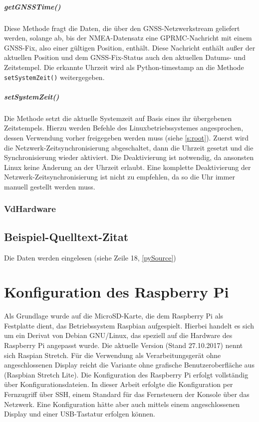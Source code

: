 \documentclass[a4paper,12pt,bibliography=totoc, listof=totoc,titlepage,pointlessnumbers]{scrreprt}
\newcommand{\code}[1]{\texttt{#1}}
\begin{document}
\paragraph{getGNSSTime()}
Diese Methode fragt die Daten, die über den GNSS-Netzwerkstream geliefert werden, solange ab, bis der NMEA-Datensatz eine GPRMC-Nachricht mit einem GNSS-Fix, also einer gültigen Position, enthält. Diese Nachricht enthält außer der aktuellen Position und dem GNSS-Fix-Status auch den aktuellen Datums- und Zeitstempel. Die erkannte Uhrzeit wird als Python-timestamp an die Methode \code{setSystemZeit()} weitergegeben.

\paragraph{setSystemZeit()}
Die Methode setzt die aktuelle Systemzeit auf Basis eines ihr übergebenen Zeitstempels. Hierzu werden Befehle des Linuxbetriebssystemes angesprochen, dessen Verwendung vorher freigegeben werden muss (siehe \autoref{s:root}). Zuerst wird die Netzwerk-Zeitsynchronisierung abgeschaltet, dann die Uhrzeit gesetzt und die Synchronisierung wieder aktiviert. Die Deaktivierung ist notwendig, da ansonsten Linux keine Änderung an der Uhrzeit erlaubt. Eine komplette Deaktivierung der Netzwerk-Zeitsynchronisierung ist nicht zu empfehlen, da so die Uhr immer manuell gestellt werden muss.

\subsection{VdHardware}



\section{Beispiel-Quelltext-Zitat}

Die Daten werden eingelesen (siehe Zeile 18, \autoref{pySource})




\chapter{Konfiguration des Raspberry Pi}
\label{c:konfig}

Als Grundlage wurde auf die MicroSD-Karte, die dem Raspberry Pi als Festplatte dient, das Betriebssystem Raspbian aufgespielt. Hierbei handelt es sich um ein Derivat von Debian GNU/Linux, das speziell auf die Hardware des Raspberry Pi angepasst wurde. Die aktuelle Version (Stand 27.10.2017) nennt sich Raspian Stretch. Für die Verwendung als Verarbeitungsgerät ohne angeschlossenen Display reicht die Variante ohne grafische Benutzeroberfläche aus (Raspbian Stretch Lite). Die Konfiguration des Raspberry Pi erfolgt vollständig über Konfigurationsdateien. In dieser Arbeit erfolgte die Konfiguration per Fernzugriff über SSH, einem Standard für das Fernsteuern der Konsole über das Netzwerk. Eine Konfiguration hätte aber auch mittels einem angeschlossenen Display und einer USB-Tastatur erfolgen können.
\end{document}
